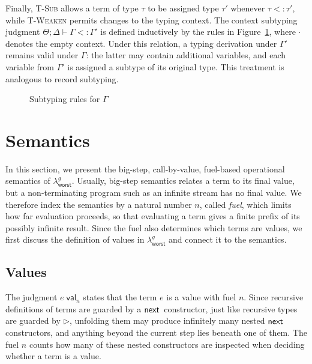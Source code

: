 Finally, \textsc{T-Sub} allows a term of type $\tau$ to be assigned type $\tau'$ whenever $\tau <: \tau'$, while \textsc{T-Weaken} permits changes to the typing context. The context subtyping judgment $\Theta;\Delta\vdash \Gamma <: \Gamma'$ is defined inductively by the rules in Figure~\ref{def:worst-case-context-sub}, 
where $\cdot$ denotes the empty context. Under this relation, a typing derivation under $\Gamma'$ remains valid under $\Gamma$: the latter may contain additional variables, and each variable from $\Gamma'$ is assigned a subtype of its original type. This treatment is analogous to record subtyping.

\begin{figure}[!htbp]
  \small
\caption{Subtyping rules for $\Gamma$}
\label{def:worst-case-context-sub}
\end{figure}

\FloatBarrier

\section{Semantics}
\label{sec:worst-case-semantics}
In this section, we present the big-step, call-by-value, fuel-based operational semantics of $\lambda^g_{\mathsf{worst}}$.
Usually, big-step semantics relates a term to its final value, but a non-terminating program such as an infinite stream has no final value.
We therefore index the semantics by a natural number $n$, called \emph{fuel}, which limits how far evaluation proceeds,
so that evaluating a term gives a finite prefix of its possibly infinite result.
Since the fuel also determines which terms are values, we first discuss the definition of values in $\lambda^g_{\mathsf{worst}}$ and connect it to the semantics.

\subsection{Values}
The judgment $e\;\mathsf{val}_n$ states that the term $e$ is a value with fuel $n$.
Since recursive definitions of terms are guarded by a $\mathsf{next}\,$ constructor, just like recursive types are guarded by $\triangleright$,
unfolding them may produce infinitely many nested $\mathsf{next}\,$ constructors, and anything beyond the current step lies beneath one of them.
The fuel $n$ counts how many of these nested constructors are inspected when deciding whether a term is a value.

